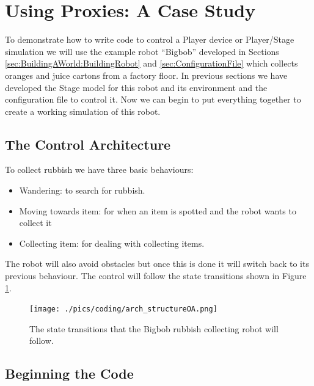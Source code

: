 \documentclass[a4paper]{report}
\newcommand{\plst}{Player/Stage\xspace}
\newcommand{\pl}{Player\xspace}
\begin{document}
\section{Using Proxies: A Case Study}\label{sec:Coding:UsingProxiesExample}

To demonstrate how to write code to control a \pl device or \plst simulation we will use the example robot ``Bigbob'' developed in Sections \ref{sec:BuildingAWorld:BuildingRobot} and \ref{sec:ConfigurationFile} which collects oranges and juice cartons from a factory floor. In previous sections we have developed the Stage model for this robot and its environment and the configuration file to control it. Now we can begin to put everything together to create a working simulation of this robot.

\subsection{The Control Architecture}\label{sec:Coding:UsingProxiesExample:ControlArch}
To collect rubbish we have three basic behaviours: 
\begin{itemize}
	\item Wandering: to search for rubbish. 
	\item Moving towards item: for when an item is spotted and the robot wants to collect it
	\item Collecting item: for dealing with collecting items.
\end{itemize}
The robot will also avoid obstacles but once this is done it will switch back to its previous behaviour. The control will follow the state transitions shown in Figure \ref{fig:Coding:UsingProxiesExample:ControlArch:Structure}.

\begin{figure}
	\centering
	\texttt{[image: ./pics/coding/arch\_structureOA.png]}
	\caption{The state transitions that the Bigbob rubbish collecting robot will follow.}
	\label{fig:Coding:UsingProxiesExample:ControlArch:Structure}
\end{figure} 

\subsection{Beginning the Code}\label{sec:Coding:UsingProxiesExample:BeginningCode}
\end{document}
